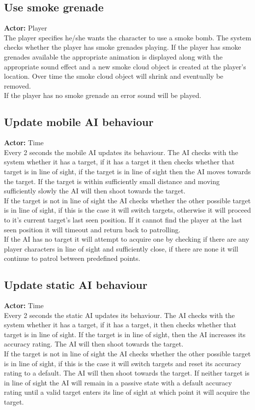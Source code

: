 \documentclass[a4paper,10pt]{article}
\begin{document}
\subsection{Use smoke grenade}
\textbf{Actor:} Player\smallskip\\
The player specifies he/she wants the character to use a smoke bomb. The system checks whether the player has smoke grenades playing. If the player has smoke grenades available the appropriate animation is displayed along with the appropriate sound effect and a new smoke cloud object is created at the player's location. Over time the smoke cloud object will shrink and eventually be removed.\smallskip\\
If the player has no smoke grenade an error sound will be played.

\subsection{Update mobile AI behaviour}
\textbf{Actor:} Time\smallskip\\
Every 2 seconds the mobile AI updates its behaviour. The AI checks with the system whether it has a target, if it has a target it then checks whether that target is in line of sight, if the target is in line of sight then the AI moves towards the target. If the target is within sufficiently small distance and moving sufficiently slowly the AI will then shoot towards the target.\smallskip\\
If the target is not in line of sight the AI checks whether the other possible target is in line of sight, if this is the case it will switch targets, otherwise it will proceed to it's current target's last seen position. If it cannot find the player at the last seen position it will timeout and return back to patrolling. \smallskip\\
If the AI has no target it will attempt to acquire one by checking if there are any player characters in line of sight and sufficiently close, if there are none it will continue to patrol between predefined points.

\subsection{Update static AI behaviour}
\textbf{Actor:} Time\smallskip\\
Every 2 seconds the static AI updates its behaviour. The AI checks with the system whether it has a target, if it has a target, it then checks whether that target is in line of sight. If the target is in line of sight, then the AI increases its accuracy rating. The AI will then shoot towards the target.\smallskip\\
If the target is not in line of sight the AI checks whether the other possible target is in line of sight, if this is the case it will switch targets and reset its accuracy rating to a default. The AI will then shoot towards the target. If neither target is in line of sight the AI will remain in a passive state with a default accuracy rating until a valid target enters its line of sight at which point it will acquire the target.
\end{document}
